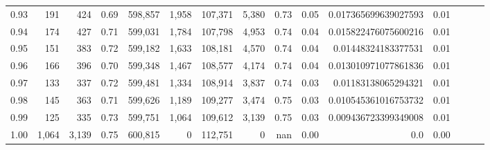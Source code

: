 \begin{tabular}{rrrrrrrrrrrrrrr}
0.93 &     191 &    424 &  0.69 &  598,857 &    1,958 &  107,371 &    5,380 &  0.73 &  0.05 &  0.017365699639027593 &      0.01 \\
0.94 &     174 &    427 &  0.71 &  599,031 &    1,784 &  107,798 &    4,953 &  0.74 &  0.04 &  0.015822476075600216 &      0.01 \\
0.95 &     151 &    383 &  0.72 &  599,182 &    1,633 &  108,181 &    4,570 &  0.74 &  0.04 &   0.01448324183377531 &      0.01 \\
0.96 &     166 &    396 &  0.70 &  599,348 &    1,467 &  108,577 &    4,174 &  0.74 &  0.04 &  0.013010971077861836 &      0.01 \\
0.97 &     133 &    337 &  0.72 &  599,481 &    1,334 &  108,914 &    3,837 &  0.74 &  0.03 &   0.01183138065294321 &      0.01 \\
0.98 &     145 &    363 &  0.71 &  599,626 &    1,189 &  109,277 &    3,474 &  0.75 &  0.03 &  0.010545361016753732 &      0.01 \\
0.99 &     125 &    335 &  0.73 &  599,751 &    1,064 &  109,612 &    3,139 &  0.75 &  0.03 &  0.009436723399349008 &      0.01 \\
1.00 &   1,064 &  3,139 &  0.75 &  600,815 &        0 &  112,751 &        0 &   nan &  0.00 &                   0.0 &      0.00 \\
\bottomrule
\end{tabular}
